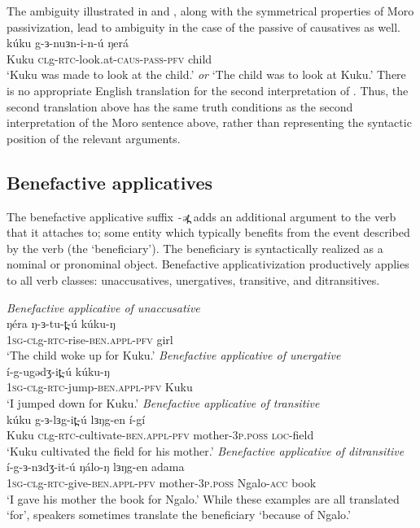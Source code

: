 The ambiguity illustrated in  and , along with the symmetrical properties of Moro passivization, lead to ambiguity in the case of the passive of causatives as well. 
\ea  \label{ex:ch12:passcaus} \gll kúku g-ɜ-nuɜn-i-n-ú ŋerá \\
 Kuku \textsc{cl}g-\textsc{rtc}-look.at-\textsc{caus-pass-pfv} child\\
\glt `Kuku was made to look at the child.'
\textit{or} `The child was to look at Kuku.'
\z
There is no appropriate English translation for the second interpretation of . Thus, the second translation above has the same truth conditions as the second interpretation of the Moro sentence above, rather than representing the syntactic position of the relevant arguments.

\subsection{Benefactive applicatives}\label{sec:ch12:applicative}

The benefactive applicative suffix \textit{-ət̪} adds an additional argument to the verb that it attaches to; some entity which typically benefits from the event described by the verb (the `beneficiary'). The beneficiary is syntactically realized as a nominal or pronominal object. Benefactive applicativization productively applies to all verb classes: unaccusatives, unergatives, transitive, and ditransitives.

\ea \textit{Benefactive applicative of unaccusative}\\
	\gll ŋéra ŋ-ɜ-tu-t̪-ú kúku-ŋ \\
	\textsc{1sg-cl}g-\textsc{rtc}-rise-\textsc{ben.appl-pfv} girl\\
	\glt `The child woke up for Kuku.' 
\ex  \textit{Benefactive applicative of unergative} \\
 	\gll í-g-ugədʒ-it̪-ú kúku-ŋ\\ 
 		\textsc{1sg-cl}g-\textsc{rtc}-jump-\textsc{ben.appl-pfv} Kuku \\
	\glt  `I jumped down for Kuku.'
\ex  \textit{Benefactive applicative of transitive}\\
 	\gll kúku g-ɜ-lɜg-it̪-ú lɜŋg-en í-gí			 \\
 	Kuku \textsc{cl}g-\textsc{rtc}-cultivate-\textsc{ben.appl-pfv} mother-\textsc{3p.poss} \textsc{loc}-field \\
 	\glt  `Kuku cultivated the field for his mother.'   
\ex  \textit{Benefactive applicative of ditransitive}\\
 	\gll í-g-ɜ-nɜdʒ-it-ú ŋálo-ŋ lɜŋg-en adama			 \\
 	\textsc{1sg-cl}g-\textsc{rtc}-give-\textsc{ben.appl-pfv}  mother-\textsc{3p.poss} Ngalo-\textsc{acc} book \\
 	\glt  `I gave his mother the book for Ngalo.'   %
 \z 
While these examples are all translated `for', speakers sometimes translate the beneficiary `because of Ngalo.'

